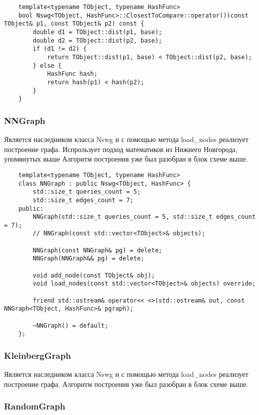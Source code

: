 \begin{verbatim}
    template<typename TObject, typename HashFunc>
    bool Nswg<TObject, HashFunc>::ClosestToCompare::operator()(const TObject& p1, const TObject& p2) const {
        double d1 = TObject::dist(p1, base);
        double d2 = TObject::dist(p2, base);
        if (d1 != d2) {
            return TObject::dist(p1, base) < TObject::dist(p2, base);
        } else {
            HashFunc hash;
            return hash(p1) < hash(p2);
        }
    }
\end{verbatim}

\subsubsection{NNGraph}

Является наследником класса Nswg и с помощью метода load\_nodes реализует построение графа.
Испрользует подход математиков из Нижнего Новгорода, упомянутых выше
Алгоритм построения уже был разобран в блок схеме выше.

\begin{verbatim}
    template<typename TObject, typename HashFunc>
    class NNGraph : public Nswg<TObject, HashFunc> {
        std::size_t queries_count = 5;
        std::size_t edges_count = 7;
    public:
        NNGraph(std::size_t queries_count = 5, std::size_t edges_count = 7);
        // NNGraph(const std::vector<TObject>& objects);

        NNGraph(const NNGraph& pg) = delete;
        NNGraph(NNGraph&& pg) = delete;

        void add_node(const TObject& obj);
        void load_nodes(const std::vector<TObject>& objects) override;

        friend std::ostream& operator<< <>(std::ostream& out, const NNGraph<TObject, HashFunc>& pgraph);

        ~NNGraph() = default;
    };
\end{verbatim}


\subsubsection{KleinbergGraph}

Является наследником класса Nswg и с помощью метода load\_nodes реализует построение графа.
Алгоритм построения уже был разобран в блок схеме выше.

\subsubsection{RandomGraph}

